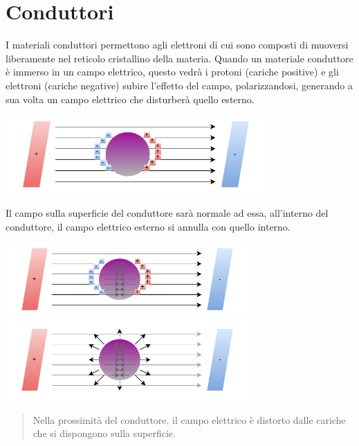 \documentclass[10pt, letterpaper]{report}
\begin{document}
\section{Conduttori}
I materiali conduttori permettono agli elettroni di cui sono composti di muoversi liberamente nel reticolo cristallino della materia. Quando un materiale conduttore è immerso in un campo elettrico, questo vedrà i protoni (cariche positive) e gli elettroni (cariche negative) subire l'effetto del campo, polarizzandosi, generando a sua volta un campo elettrico che disturberà quello esterno.\begin{center}
    \includegraphics[width=0.75\textwidth]{images/conduttore.pdf}
\end{center}
Il campo sulla superficie del conduttore sarà normale ad essa, all'interno del conduttore, il campo elettrico esterno si annulla con quello interno.\begin{center}
\includegraphics[width=0.7\textwidth]{images/conduttore2.pdf}
\includegraphics[width=0.7\textwidth]{images/conduttore3.pdf}
\end{center}
\begin{quote}
    Nella prossimità del conduttore, il campo elettrico è distorto dalle cariche che si dispongono sulla superficie.
\end{quote}
\end{document}
